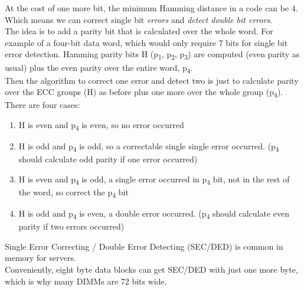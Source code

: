 \documentclass[12pt]{article}
\theoremstyle{definition}
\begin{document}
  At the cost of one more bit, the minimum Hamming distance in a code can be 4.
  Which means we can correct single bit \emph{errors} and \emph{detect double bit errors}. \\
  The idea is to add a parity bit that is calculated over the whole word.
  For example of a four-bit data word, which would only require 7 bits for single bit error detection.
  Hamming parity bits H (p\textsubscript{1}, p\textsubscript{2}, p\textsubscript{3}) are computed (even parity as usual) plus the even parity over the entire word, p\textsubscript{4}. \\
  Then the algorithm to correct one error and detect two is just to calculate parity over the ECC groups (H) as before plus one more over the whole group (p\textsubscript{4}).
  There are four cases:
  \begin{enumerate}
    \item H is even and p\textsubscript{4} is even, so no error occurred
    \item H is odd and p\textsubscript{4} is odd, so a correctable single single error occurred. (p\textsubscript{4} should calculate odd parity if one error occurred)
    \item H is even and p\textsubscript{4} is odd, a single error occurred in p\textsubscript{4} bit, not in the rest of the word, so correct the p\textsubscript{4} bit
    \item H is odd and p\textsubscript{4} is even, a double error occurred. (p\textsubscript{4} should calculate even parity if two errors occurred)
  \end{enumerate}
  Single Error Correcting / Double Error Detecting (SEC/DED) is common in memory for servers. \\
  Conveniently, eight byte data blocks can get SEC/DED with just one more byte, which is why many DIMMs are 72 bits wide.

  \newpage
\end{document}
